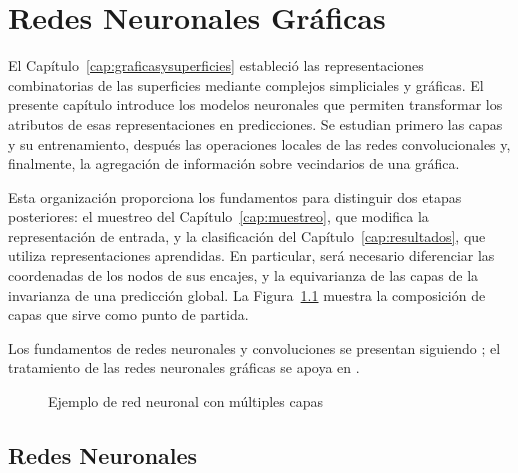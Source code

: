 \chapter{Redes Neuronales Gráficas}\label{cap:redes}

El Capítulo~\ref{cap:graficasysuperficies} estableció las representaciones combinatorias de las superficies mediante complejos simpliciales y gráficas. El presente capítulo introduce los modelos neuronales que permiten transformar los atributos de esas representaciones en predicciones. Se estudian primero las capas y su entrenamiento, después las operaciones locales de las redes convolucionales y, finalmente, la agregación de información sobre vecindarios de una gráfica.

Esta organización proporciona los fundamentos para distinguir dos etapas posteriores: el muestreo del Capítulo~\ref{cap:muestreo}, que modifica la representación de entrada, y la clasificación del Capítulo~\ref{cap:resultados}, que utiliza representaciones aprendidas. En particular, será necesario diferenciar las coordenadas de los nodos de sus encajes, y la equivarianza de las capas de la invarianza de una predicción global. La Figura~\ref{fig:red_neuronal_multicapa} muestra la composición de capas que sirve como punto de partida.

Los fundamentos de redes neuronales y convoluciones se presentan siguiendo \cite{Goodfellow-et-al-2016}; el tratamiento de las redes neuronales gráficas se apoya en \cite{graph_representation_learning}.

\begin{figure}[H]
    \centering
    \caption{Ejemplo de red neuronal con múltiples capas}
    \label{fig:red_neuronal_multicapa}

\end{figure}

\section{Redes Neuronales}

